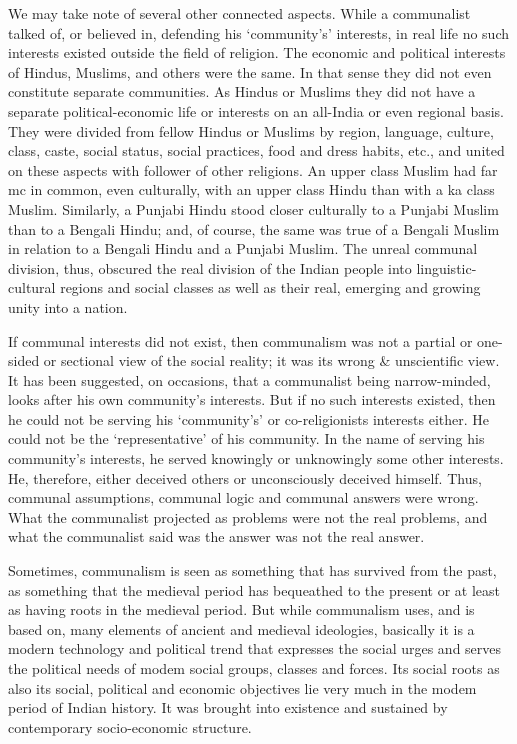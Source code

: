 \begin{multicols}{2}
We may take note of several other connected aspects. While a communalist talked of, or believed in, defending his `community's' interests, in real life no such interests existed outside the field of religion. The economic and political interests of Hindus, Muslims, and others were the same. In that sense they did not even constitute separate communities. As Hindus or Muslims they did not have a separate political-economic life or interests on an all-India or even regional basis. They were divided from fellow Hindus or Muslims by region, language, culture, class, caste, social status, social practices, food and dress habits, etc., and united on these aspects with follower of other religions. An upper class Muslim had far mc in common, even culturally, with an upper class Hindu than with a ka class Muslim. Similarly, a Punjabi Hindu stood closer culturally to a Punjabi Muslim than to a Bengali Hindu; and, of course, the same was true of a Bengali Muslim in relation to a Bengali Hindu and a Punjabi Muslim. The unreal communal division, thus, obscured the real division of the Indian people into linguistic-cultural regions and social classes as well as their real, emerging and growing unity into a nation. 

If communal interests did not exist, then communalism was not a partial or one-sided or sectional view of the social reality; it was its wrong \& unscientific view. It has been suggested, on occasions, that a communalist being narrow-minded, looks after his own community's interests. But if no such interests existed, then he could not be serving his `community's' or co-religionists interests either. He could not be the `representative' of his community. In the name of serving his community's interests, he served knowingly or unknowingly some other interests. He, therefore, either deceived others or unconsciously deceived himself. Thus, communal assumptions, communal logic and communal answers were wrong. What the communalist projected as problems were not the real problems, and what the communalist said was the answer was not the real answer. 

Sometimes, communalism is seen as something that has survived from the past, as something that the medieval period has bequeathed to the present or at least as having roots in the medieval period. But while communalism uses, and is based on, many elements of ancient and medieval ideologies, basically it is a modern technology and political trend that expresses the social urges and serves the political needs of modem social groups, classes and forces. Its social roots as also its social, political and economic objectives lie very much in the modem period of Indian history. It was brought into existence and sustained by contemporary socio-economic structure. 


\end{multicols}
